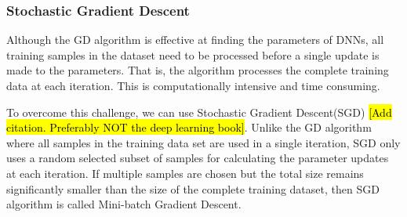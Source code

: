 \documentclass[conference]{IEEEtran}
\begin{document}







\subsubsection{Stochastic Gradient Descent}
Although the GD algorithm is effective at finding the parameters of DNNs, all  training samples in the dataset need to be processed
before a single update is made to the parameters. That is, the algorithm processes the complete training data at each iteration. 
This is computationally intensive and time consuming. 


To overcome this challenge, we can use Stochastic Gradient Descent(SGD) \cite{} \hl{[Add citation. Preferably NOT the deep learning
book]}. Unlike the GD algorithm where all samples in the training data set are used in a single iteration, SGD only uses a random 
selected subset of samples for calculating the parameter updates at each iteration. 
If multiple samples are chosen but the total size remains significantly smaller than the size of the complete
training dataset, then SGD algorithm is called Mini-batch Gradient Descent.
\end{document}
